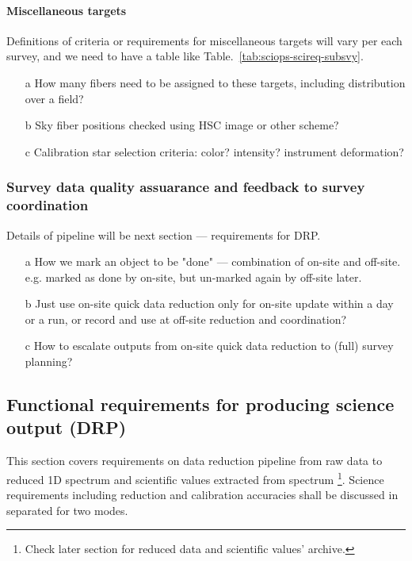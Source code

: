 \documentclass[a4paper,notitlepage]{article}
\begin{document}
\paragraph{Miscellaneous targets}

Definitions of criteria or requirements for miscellaneous targets will 
vary per each survey, and we need to have a table like 
Table.~\ref{tab:sciops-scireq-subsvy}. 

\begin{enumerate}
  \item[a] How many fibers need to be assigned to these targets, including 
    distribution over a field? 
  \item[b] Sky fiber positions checked using HSC image or other scheme?
  \item[c] Calibration star selection criteria: color? intensity? instrument deformation?
\end{enumerate}



\subsubsection{Survey data quality assuarance and feedback to survey coordination}

Details of pipeline will be next section --- requirements for DRP. 

\begin{enumerate}
  \item[a] How we mark an object to be "done" --- 
    combination of on-site and off-site. 
    e.g. marked as done by on-site, but un-marked again by off-site later.
  \item[b] Just use on-site quick data reduction only for on-site update 
    within a day or a run, or record and use at off-site reduction and 
    coordination?
  \item[c] How to escalate outputs from on-site quick data reduction to 
    (full) survey planning?
\end{enumerate}


\subsection{Functional requirements for producing science output (DRP)}

This section covers requirements on data reduction pipeline from raw data to 
reduced 1D spectrum and scientific values extracted from spectrum 
\footnote{Check later section for reduced data and scientific values' archive.}.
Science requirements including reduction and calibration accuracies shall 
be discussed in separated for two modes. 
\end{document}
